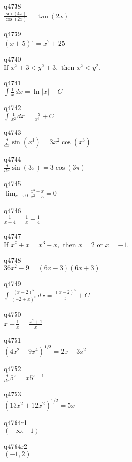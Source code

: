q4738\\
\(\displaystyle \frac{\sin(4x)}{\cos(2x)} = \tan(2x) \)

q4739\\
\(\displaystyle (x+5)^2 = x^2 + 25 \)

q4740\\
\(\displaystyle \text{If } x^2 + 3 < y^2 + 3, \text{ then } x^2 <  y^2. \)

q4741\\
\(\displaystyle \int \frac{1}{x}\,dx = \ln |x| + C \)

q4742\\
\(\displaystyle \int \frac{1}{x^2}\,dx = \frac{-3}{x^3} + C \)

q4743\\
\(\displaystyle \frac{d}{dx} \sin(x^3) = 3x^2 \cos(x^3) \)

q4744\\
\(\displaystyle \frac{d}{dx} \sin(3\pi) = 3\cos(3 \pi) \)

q4745\\
\(\displaystyle \lim_{x \rightarrow 0} \frac{x^3-x}{x^2+5} = 0 \)

q4746\\
\(\displaystyle \frac{1}{x+4} = \frac{1}{x} + \frac{1}{4} \)

q4747\\
\(\displaystyle \text{If } x^2 + x = x^3 - x, \text{ then } x = 2 \text{ or } x = -1. \)

q4748\\
\(\displaystyle 36x^2 - 9 = (6x-3)(6x+3) \)

q4749\\
\(\displaystyle \int \frac{(x-2)^6}{(-2+x)^2}\,dx = \frac{(x-2)^5}{5} + C \)

q4750\\
\(\displaystyle x + \frac{1}{x} = \frac{x^2 + 1}{x} \)

q4751\\
\(\displaystyle (4x^2 + 9x^4)^{1/2} = 2x + 3x^2 \)

q4752\\
\(\displaystyle \frac{d}{dx} 5^x = x5^{x-1} \)

q4753\\
\(\displaystyle (13x^2 + 12x^2)^{1/2} = 5x \)

q4764r1\\
\(\displaystyle (-\infty, -1) \)

q4764r2\\
\(\displaystyle (-1, 2) \)

